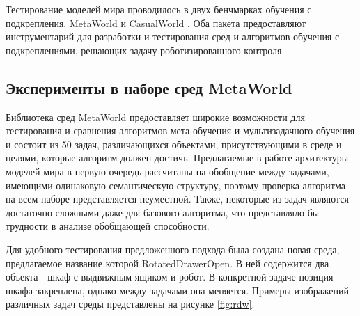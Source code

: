 


Тестирование моделей мира проводилось в двух бенчмарках обучения с подкрепления, MetaWorld \cite{mtw} и CasualWorld \cite{cw}. 
Оба пакета предоставляют инструментарий для разработки и тестирования сред и алгоритмов обучения с подкреплениями, решающих задачу роботизированного контроля.

\subsection{Эксперименты в наборе сред MetaWorld}
Библиотека сред MetaWorld \cite{mtw} предоставляет широкие возможности для тестирования и сравнения алгоритмов мета-обучения и мультизадачного обучения и состоит из 50 задач, различающихся объектами, присутствующими в среде и целями, которые алгоритм должен достичь. Предлагаемые в работе архитектуры моделей мира в первую очередь рассчитаны на обобщение между задачами, имеющими одинаковую семантическую структуру, поэтому проверка алгоритма на всем наборе представляется неуместной. Также, некоторые из задач являются достаточно сложными даже для базового алгоритма, что представляло бы трудности в анализе обобщающей способности.

Для удобного тестирования предложенного подхода была создана новая среда, предлагаемое название которой RotatedDrawerOpen.
В ней содержится два объекта - шкаф с выдвижным ящиком и робот.
В конкретной задаче позиция шкафа закреплена, однако между задачами она меняется.
Примеры изображений различных задач среды представлены на рисунке \ref{fig:rdw}.

